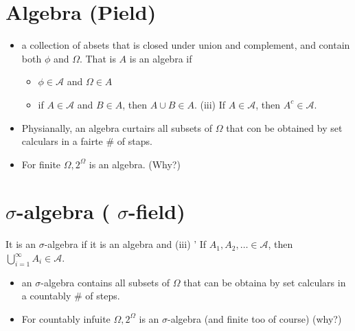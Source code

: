 \documentclass[10pt]{article}
\begin{document}
\section*{Algebra (Pield)}
\begin{itemize}
  \item[-] a collection of absets that is closed under union and complement, and contain both \(\phi\) and \(\Omega\). That is \(A\) is an algebra if
  \begin{itemize}
    \item[(i)] \(\phi \in \mathcal{A}\) and \(\Omega \in A\)
    \item[(ii)] if \(A \in \mathcal{A}\) and \(B \in A\), then \(A \cup B \in A\). (iii) If \(A \in \mathcal{A}\), then \(A^{c} \in \mathcal{A}\).
  \end{itemize}
  \item[-] Physianally, an algebra curtairs all subsets of \(\Omega\) that con be obtained by set calculars in a fairte \(\#\) of staps.
  \item[-] For finite \(\Omega, 2^{\Omega}\) is an algebra. (Why?)
\end{itemize}

\section*{\(\sigma\)-algebra ( \(\sigma\)-field)}
It is an \(\sigma\)-algebra if it is an algebra and (iii) ' If \(A_{1}, A_{2}, \ldots \in \mathcal{A}\), then \(\bigcup_{i=1}^{\infty} A_{i} \in \mathcal{A}\).

\begin{itemize}
  \item[-] an \(\sigma\)-algebra contains all subsets of \(\Omega\) that can be obtaina by set calculars in a countably \# of steps.
  \item[-] For countably infuite \(\Omega, 2^{\Omega}\) is an \(\sigma\)-algebra (and finite too of course) (why?)
\end{itemize}
\end{document}
